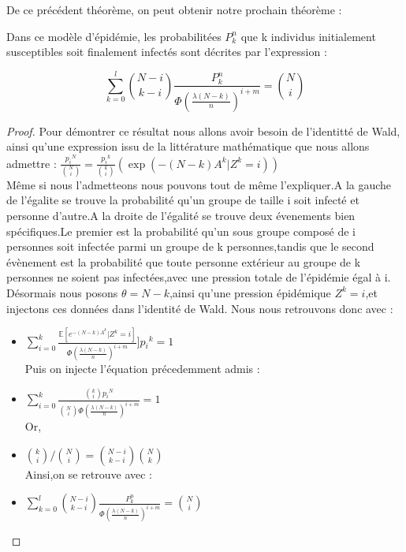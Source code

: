 De ce précédent théorème, on peut obtenir notre prochain théorème :
\begin{theorem}
Dans ce modèle d'épidémie, les probabilitées $P_{k}^{n}$ que k individus initialement susceptibles soit finalement infectés sont décrites par l'expression :

$$\sum_{k=0}^{l}\binom{N-i}{k-i}\frac{P_{k}^{n}}{\Phi( \frac{\lambda (N-k)}{n})^{i + m} }=\binom{N}{i}$$
\end{theorem}

\begin{proof}
Pour démontrer ce résultat nous allons avoir besoin de l'identitté de Wald, ainsi qu'une expression issu de la littérature mathématique que nous allons admettre :
$ \frac{{p_{i}}^{N}}{\binom{N}{i}}= \frac{{p_{i}}^{k}}{\binom{k}{i}}\left ( \exp(-(N-k)A^{k}|Z^{k}=i)  \right )$\\
Même si nous l'admetteons nous pouvons tout de même l'expliquer.A la gauche de l'égalite se trouve la probabilité qu'un groupe de taille i soit infecté et personne d'autre.A la droite de l'égalité se trouve deux évenements bien spécifiques.Le premier est la probabilité qu'un sous groupe composé de i personnes soit infectée parmi un groupe de k personnes,tandis que le second évènement est la probabilité que toute personne extérieur au groupe de k personnes ne soient pas infectées,avec une pression totale de l'épidémie égal à i.\\

Désormais nous posons $\theta = N-k$,ainsi qu'une pression épidémique $Z^{k} = i$,et injectons ces données dans l'identité de Wald.
Nous nous retrouvons donc avec :
\begin{itemize}[label=$\bullet$]
	\item $\sum_{i=0}^{k} \frac{ \mathbb{E}[e^{-(N-k) A^{k}}|Z^{k}=i ]}{ \Phi( \frac{\lambda (N-k)}{n})^{i + m} } ]p{_{i}}^{k} = 1$\\
	Puis on injecte l'équation précedemment admis :\\
	\item $\sum_{i=0}^{k}\frac{\binom{k}{i}p{_{i}}^{N}}{\binom{N}{i}\Phi( \frac{\lambda (N-k)}{n})^{i + m} } = 1$\\
	Or,\\
	\item $\binom{k}{i}/\binom{N}{i} = \binom{N-i}{k-i}\binom{N}{k}$\\
	Ainsi,on se retrouve avec :\\
	\item $\sum_{k=0}^{l}\binom{N-i}{k-i}\frac{P_{k}^{n}}{\Phi( \frac{\lambda (N-k)}{n})^{i + m} }=\binom{N}{i}$
\end{itemize}	


\end{proof}


